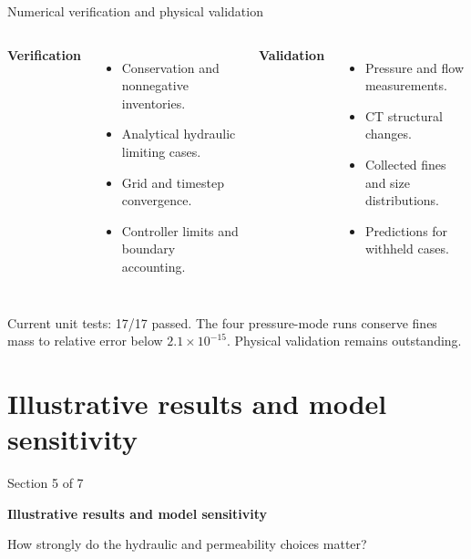 \documentclass[aspectratio=169,11pt]{beamer}
\newcommand{\hi}[1]{\textcolor{tumblue}{\textbf{#1}}}
\begin{document}
\begin{frame}{Numerical verification and physical validation}
\small

\begin{columns}[T,onlytextwidth]
\hi{Verification}
\begin{itemize}
\item Conservation and nonnegative inventories.
\item Analytical hydraulic limiting cases.
\item Grid and timestep convergence.
\item Controller limits and boundary accounting.
\end{itemize}
\hi{Validation}
\begin{itemize}
\item Pressure and flow measurements.
\item CT structural changes.
\item Collected fines and size distributions.
\item Predictions for withheld cases.
\end{itemize}
\end{columns}
\vfill
\small Current unit tests: 17/17 passed. The four pressure-mode runs conserve fines mass to relative error below $2.1\times10^{-15}$. Physical validation remains outstanding.

\end{frame}

\section[Results]{Illustrative results and model sensitivity}
\begin{frame}{}
\vfill
{\large\color{tumgray}Section 5 of 7}\par\vspace{0.4cm}
{\LARGE\color{tumblue}\textbf{Illustrative results and model sensitivity}}\par\vspace{0.5cm}
{\large How strongly do the hydraulic and permeability choices matter?}
\vfill
\end{frame}
\end{document}
